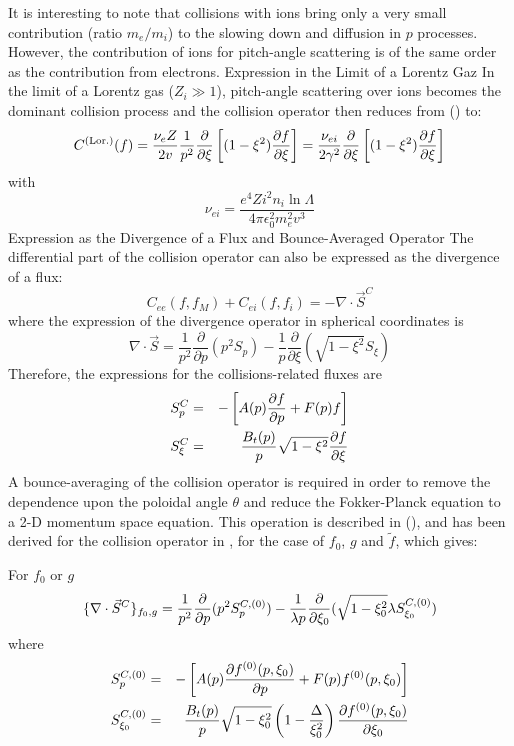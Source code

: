 It is interesting to note that collisions with ions bring only a very small
contribution (ratio $m_{e}/m_{i}$) to the slowing down and diffusion in $p$
processes. However, the contribution of ions for pitch-angle scattering is
of the same order as the contribution from electrons. Expression in the
Limit of a Lorentz Gaz In the limit of a Lorentz gas ($Z_{i}\gg 1$),
pitch-angle scattering over ions becomes the dominant collision process and
the collision operator then reduces from () to: 
\[
C^{(\text{Lor.})}(f)=\frac{\nu _{e}Z}{2v}\frac{1}{p^{2}}\frac{\partial }{%
\partial \xi }\left[ (1-\xi ^{2})\frac{\partial f}{\partial \xi }\right] =%
\frac{\nu _{ei}}{2\gamma ^{2}}\frac{\partial }{\partial \xi }\left[ (1-\xi
^{2})\frac{\partial f}{\partial \xi }\right] 
\]
with 
\[
\nu _{ei}=\frac{e^{4}Zi^{2}n_{i}\ln \Lambda }{4\pi \epsilon
_{0}^{2}m_{e}^{2}v^{3}}
\]
Expression as the Divergence of a Flux and Bounce-Averaged Operator The
differential part of the collision operator can also be expressed as the
divergence of a flux: 
\[
C_{ee}(f,f_{M})+C_{ei}(f,f_{i})=-\nabla \cdot \vec{S}^{C}
\]
where the expression of the divergence operator in spherical coordinates is 
\[
\nabla \cdot \vec{S}=\frac{1}{p^{2}}\frac{\partial }{\partial p}(p^{2}S_{p})-%
\frac{1}{p}\frac{\partial }{\partial \xi }(\sqrt{1-\xi ^{2}}S_{\xi })
\]
Therefore, the expressions for the collisions-related fluxes are 
\begin{eqnarray*}
S_{p}^{C} &=&-\left[ A(p)\frac{\partial f}{\partial p}+F(p)f\right]  \\
S_{\xi }^{C} &=&\frac{B_{t}(p)}{p}\sqrt{1-\xi ^{2}}\frac{\partial f}{%
\partial \xi }
\end{eqnarray*}
A bounce-averaging of the collision operator is required in order to remove
the dependence upon the poloidal angle $\theta $ and reduce the
Fokker-Planck equation to a 2-D momentum space equation. This operation is
described in (), and has been derived for the collision operator in , for
the case of $f_{0}$, $g$ and $\tilde{f}$, which gives:

For $f_{0}$ or $g$ 
\[
\{\nabla \cdot \vec{S}^{C}\}_{f_{0},g}=\frac{1}{p^{2}}\frac{\partial }{%
\partial p}(p^{2}S_{p}^{C,(0)})-\frac{1}{\lambda p}\frac{\partial }{\partial 
\xi _{0}}(\sqrt{1-\xi _{0}^{2}}\lambda S_{\xi _{0}}^{C,(0)})
\]
where 
\begin{eqnarray*}
S_{p}^{C,(0)} &=&-\left[ A(p)\frac{\partial f^{(0)}(p,\xi _{0})}{\partial p}
+F(p)f^{(0)}(p,\xi _{0})\right]  \\
S_{\xi _{0}}^{C,(0)} &=&\frac{B_{t}(p)}{p}\sqrt{1-\xi _{0}^{2}}\left( 1-%
\frac{\Delta }{\xi _{0}^{2}}\right) \frac{\partial f^{(0)}(p,\xi _{0})}{%
\partial \xi _{0}}
\end{eqnarray*}

